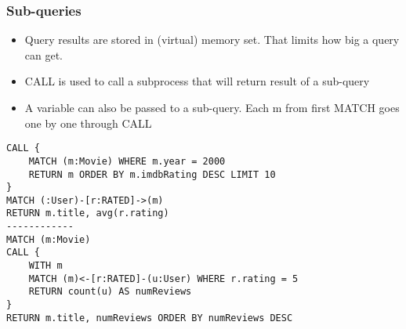 \begin{frame}[fragile]\frametitle{Sub-queries}

\begin{itemize}
\item Query results are stored in (virtual) memory set. That limits how big a query can get.
\item CALL is used to call a subprocess that will return result of a sub-query
\item A variable can also be passed to a sub-query. Each m from first MATCH goes one by one through CALL
\end{itemize}


\begin{lstlisting}
CALL {
	MATCH (m:Movie) WHERE m.year = 2000
	RETURN m ORDER BY m.imdbRating DESC LIMIT 10
}
MATCH (:User)-[r:RATED]->(m)
RETURN m.title, avg(r.rating)
------------
MATCH (m:Movie)
CALL {
	WITH m
	MATCH (m)<-[r:RATED]-(u:User) WHERE r.rating = 5
	RETURN count(u) AS numReviews
}
RETURN m.title, numReviews ORDER BY numReviews DESC
\end{lstlisting}

\end{frame}
